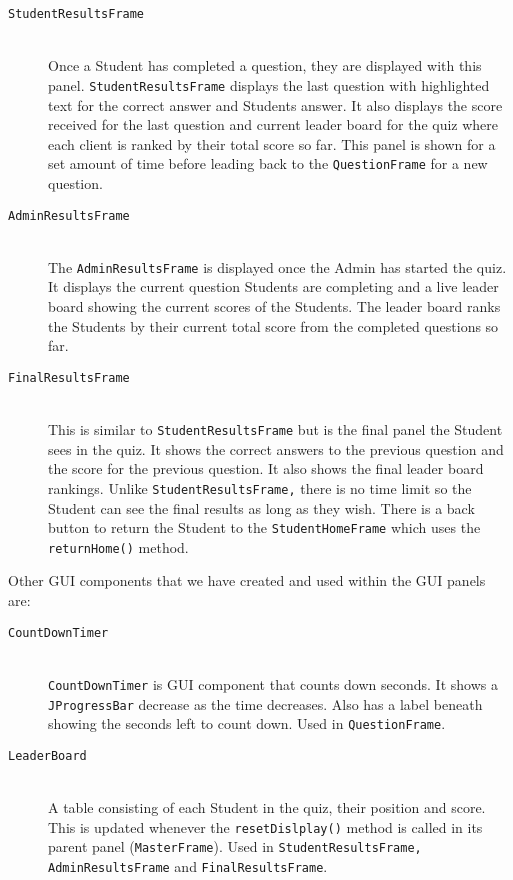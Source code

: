 \begin{enumerate}
\begin{description}
		\item[\texttt{StudentResultsFrame}]\hfill \\ Once a Student has
			completed a question, they are displayed with this panel.
			\texttt{StudentResultsFrame} displays the last question with
			highlighted text for the correct answer and Students answer. It
			also displays the score received for the last question and current
			leader board for the quiz where each client is ranked by their
			total score so far. This panel is shown for a set amount of time
			before leading back to the \texttt{QuestionFrame} for a new
			question.

		\item[\texttt{AdminResultsFrame}]\hfill \\ The
			\texttt{AdminResultsFrame} is displayed once the Admin has started
			the quiz. It displays the current question Students are completing
			and a live leader board showing the current scores of the Students.
			The leader board ranks the Students by their current total score
			from the completed questions so far.

		\item[\texttt{FinalResultsFrame}]\hfill \\ This is similar to
			\texttt{StudentResultsFrame} but is the final panel the Student
			sees in the quiz. It shows the correct answers to the previous
			question and the score for the previous question. It also shows the
			final leader board rankings. Unlike \texttt{StudentResultsFrame,}
			there is no time limit so the Student can see the final results as
			long as they wish. There is a back button to return the Student to
			the \texttt{StudentHomeFrame} which uses the \verb+returnHome()+
			method.

	\end{description}

	Other GUI components that we have created and used within the GUI panels are:

	\begin{description}

		\item[\texttt{CountDownTimer}]\hfill \\ \texttt{CountDownTimer} is GUI
			component that counts down seconds. It shows a
			\texttt{JProgressBar} decrease as the time decreases. Also has a
			label beneath showing the seconds left to count down. Used in
			\texttt{QuestionFrame}.

		\item[\texttt{LeaderBoard}]\hfill \\ A table consisting of each Student
			in the quiz, their position and score. This is updated whenever the
			\verb+resetDislplay()+ method is called in its parent panel
			(\texttt{MasterFrame}). Used in \texttt{StudentResultsFrame,}
			\texttt{AdminResultsFrame} and \texttt{FinalResultsFrame}.

	\end{description}

\end{enumerate}
